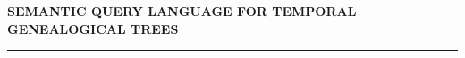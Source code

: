 \newpage
\thispagestyle{empty}

\mbox{}

\vspace{7cm}

\begin{flushright}

\textbf{\LARGE SEMANTIC QUERY LANGUAGE FOR TEMPORAL GENEALOGICAL TREES}

\vspace{0.1cm}

\rule{\linewidth}{0.15cm}%
\end{flushright}
